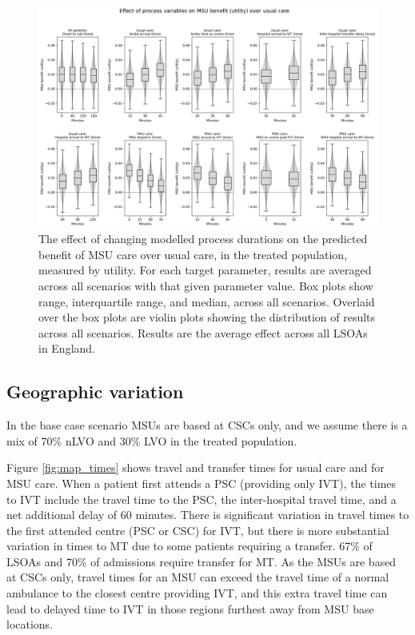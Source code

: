 \begin{figure}[h!]
    \centering
    \includegraphics[width=1\linewidth]{images/msu_net_utility_benefit.png}
    \caption{The effect of changing modelled process durations on the predicted benefit of MSU care over usual care, in the treated population, measured by utility. For each target parameter, results are averaged across all scenarios with that given parameter value. Box plots show range, interquartile range, and median, across all scenarios. Overlaid over the box plots are violin plots showing the distribution of results across all scenarios. Results are the average effect across all LSOAs in England.}
    \label{fig:scenarios_utility}
\end{figure}

\subsection{Geographic variation}

In the base case scenario MSUs are based at CSCs only, and we assume there is a mix of 70\% nLVO and 30\% LVO in the treated population.

Figure \ref{fig:map_times} shows travel and transfer times for usual care and for MSU care. When a patient first attends a PSC (providing only IVT), the times to IVT include the travel time to the PSC, the inter-hospital travel time, and a net additional delay of 60 minutes. There is significant variation in travel times to the first attended centre (PSC or CSC) for IVT, but there is more substantial variation in times to MT due to some patients requiring a transfer. 67\% of LSOAs and 70\% of admissions require transfer for MT. As the MSUs are based at CSCs only, travel times for an MSU can exceed the travel time of a normal ambulance to the closest centre providing IVT, and this extra travel time can lead to delayed time to IVT in those regions furthest away from MSU base locations.


